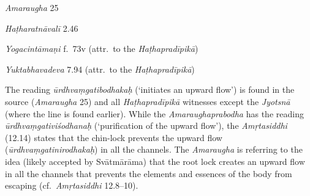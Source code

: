 \begin{ekdosis}
\begin{sources}[hp03_024]
\emph{Amaraugha} 25
\begin{versinnote}
\end{versinnote}
\end{sources}

\begin{testimonia}[hp03_024]
\emph{Haṭharatnāvalī} 2.46
\begin{versinnote}
\end{versinnote}

\emph{Yogacintāmaṇi} f.~73v (attr.~to the \emph{Haṭhapradīpikā})
\begin{versinnote}
\end{versinnote}

\emph{Yuktabhavadeva} 7.94 (attr.~to the \emph{Haṭhapradīpikā})
\begin{versinnote}
\end{versinnote}
\end{testimonia}

\begin{philcomm}[hp03_024]
The reading \emph{ūrdhvaṃgatibodhakaḥ} (`initiates an upward flow') is found in the source (\emph{Amaraugha} 25) and all \emph{Haṭhapradīpikā} witnesses except the \emph{Jyotsnā} (where the line is found earlier). While the \emph{Amaraughaprabodha} has the reading \emph{ūrdhvaṃgativiśodhanaḥ} (`purification of the upward flow'), the \emph{Amṛtasiddhi} (12.14) states that the chin-lock prevents the upward flow (\emph{ūrdhvaṃgatinirodhakaḥ}) in all the channels. The \textit{Amaraugha} is referring to the idea (likely accepted by Svātmārāma) that the root lock creates an upward flow in all the channels that prevents the elements and essences of the body from escaping (cf.~\emph{Amṛtasiddhi} 12.8–10).


\end{philcomm}
\end{ekdosis}
